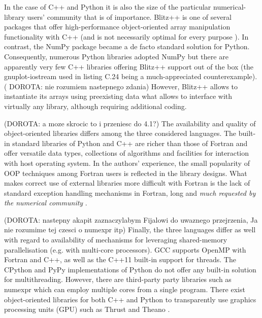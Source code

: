 \documentclass[final,5p,times,twocolumn]{elsarticle}
\begin{document}
  In the case of C++ and Python it is also the size of the particular
    numerical-library users' community that is of importance.
  Blitz++ is one of several packages that offer high-performance object-oriented
    array manipulation functionality with C++ (and is not necessarily optimal for every
    purpose \citep{Iglberger_et_al_2012}).
  In contrast, the NumPy package became a de facto standard solution for Python.
  Consequently, numerous Python libraries adopted NumPy but
    there are apparently very few C++ libraries offering Blitz++ support out of the box
    (the gnuplot-iostream used in listing C.24 being a much-appreciated counterexample).
 ( DOROTA: nie rozumiem nastepnego zdania)
  However, Blitz++ allows to instantiate its arrays using preexisting data what
    allows to interface with virtually any library, although requiring additional
    coding.
  
(DOROTA: a moze skrocic to i przeniesc do 4.1?)
  The availability and quality of object-oriented 
    libraries differs among the three considered languages.
  The built-in standard libraries of Python and C++ are richer than
    those of Fortran and offer versatile data types, collections of
    algorithms and facilities for interaction with host operating system.
  In the authors' experience, the small popularity of OOP techniques among
    Fortran users is reflected in the library designs.
  What makes correct use of external libraries more difficult with Fortran
    is the lack of standard exception handling mechanisms in Fortran,
    long and {\em much requested by the numerical community} \citep[][Foreword]{Press_et_al_1996}.

(DOROTA: nastepny akapit zaznaczylabym Fijalowi do uwaznego przejrzenia, 
Ja nie rozumime tej czesci o numexpr itp)
  Finally, the three languages differ as well with regard to availability of 
    mechanisms for leveraging shared-memory parallelisation (e.g. with multi-core processors).
  GCC supports OpenMP with Fortran and C++, as well as the C++11 built-in support for threads.
  The CPython and PyPy implementations of Python do not offer any
    built-in solution for multithreading. 
  However, there are third-party party libraries such as numexpr which can employ multiple cores from
    a single program.
  There exist object-oriented libraries for both C++ and Python to 
    transparently use graphics processing units (GPU) such as Thrust \citep{Thrust}
    and Theano \citep{Bergstra_et_al_2010}. 
  
\end{document}
